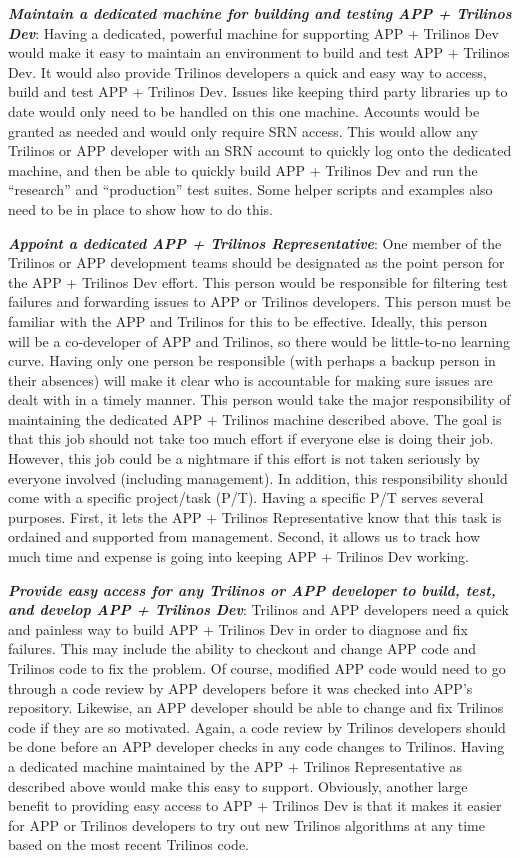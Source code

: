 \documentclass[pdf,ps2pdf,11pt]{SANDreport}
\begin{document}
{}\textit{\textbf{Maintain a dedicated machine for building and testing APP +
Trilinos Dev}}: Having a dedicated, powerful machine for supporting APP +
Trilinos Dev would make it easy to maintain an environment to build and test
APP + Trilinos Dev.  It would also provide Trilinos developers a quick and
easy way to access, build and test APP + Trilinos Dev.  Issues like keeping
third party libraries up to date would only need to be handled on this one
machine.  Accounts would be granted as needed and would only require SRN
access.  This would allow any Trilinos or APP developer with an SRN account to
quickly log onto the dedicated machine, and then be able to quickly build APP
+ Trilinos Dev and run the ``research'' and ``production'' test suites.  Some
helper scripts and examples also need to be in place to show how to do this.

{}\textit{\textbf{Appoint a dedicated APP + Trilinos Representative}}: One
member of the Trilinos or APP development teams should be designated as the
point person for the APP + Trilinos Dev effort.  This person would be
responsible for filtering test failures and forwarding issues to APP or
Trilinos developers.  This person must be familiar with the APP and Trilinos
for this to be effective.  Ideally, this person will be a co-developer of APP
and Trilinos, so there would be little-to-no learning curve.  Having only one
person be responsible (with perhaps a backup person in their absences) will
make it clear who is accountable for making sure issues are dealt with in a
timely manner.  This person would take the major responsibility of maintaining
the dedicated APP + Trilinos machine described above. The goal is that this
job should not take too much effort if everyone else is doing their job.
However, this job could be a nightmare if this effort is not taken seriously
by everyone involved (including management).  In addition, this responsibility
should come with a specific project/task (P/T).  Having a specific P/T serves
several purposes.  First, it lets the APP + Trilinos Representative know that
this task is ordained and supported from management.  Second, it allows us to
track how much time and expense is going into keeping APP + Trilinos Dev
working.

{}\textit{\textbf{Provide easy access for any Trilinos or APP developer to
build, test, and develop APP + Trilinos Dev}}: Trilinos and APP developers
need a quick and painless way to build APP + Trilinos Dev in order to diagnose
and fix failures.  This may include the ability to checkout and change APP
code and Trilinos code to fix the problem.  Of course, modified APP code would
need to go through a code review by APP developers before it was checked into
APP's repository.  Likewise, an APP developer should be able to change and fix
Trilinos code if they are so motivated.  Again, a code review by Trilinos
developers should be done before an APP developer checks in any code changes
to Trilinos.  Having a dedicated machine maintained by the APP + Trilinos
Representative as described above would make this easy to support.  Obviously,
another large benefit to providing easy access to APP + Trilinos Dev is that
it makes it easier for APP or Trilinos developers to try out new Trilinos
algorithms at any time based on the most recent Trilinos code.
\end{document}
